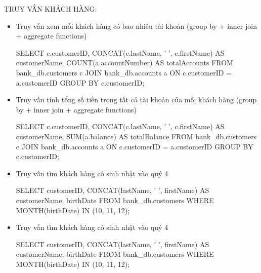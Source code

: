 
TRUY VẤN KHÁCH HÀNG:
\begin{itemize}

    \item Truy vấn xem mỗi khách hàng có bao nhiêu tài khoản (group by + inner join + aggregate functions)
    \begin{MySQLCode}
    SELECT 
        c.customerID,
        CONCAT(c.lastName, ' ', c.firstName) AS customerName,
        COUNT(a.accountNumber) AS totalAccounts
    FROM 
        bank_db.customers c
    JOIN 
        bank_db.accounts a ON c.customerID = a.customerID
    GROUP BY 
        c.customerID;
    \end{MySQLCode}

    \item Truy vấn tính tổng số tiền trong tất cả tài khoản của mỗi khách hàng (group by + inner join + aggregate functions)
    \begin{MySQLCode}
    SELECT 
        c.customerID,
	   CONCAT(c.lastName, ' ', c.firstName) AS customerName,
        SUM(a.balance) AS totalBalance
    FROM 
        bank_db.customers c
    JOIN 
        bank_db.accounts a ON c.customerID = a.customerID
    GROUP BY 
	   c.customerID;
    \end{MySQLCode}

    \item Truy vấn tìm khách hàng có sinh nhật vào quý 4
    \begin{MySQLCode}
    SELECT 
        customerID,
        CONCAT(lastName, ' ', firstName) AS customerName,
        birthDate
    FROM 
        bank_db.customers
    WHERE 
        MONTH(birthDate) IN (10, 11, 12);
    \end{MySQLCode}

    \item Truy vấn tìm khách hàng có sinh nhật vào quý 4
    \begin{MySQLCode}
    SELECT 
        customerID,
        CONCAT(lastName, ' ', firstName) AS customerName,
        birthDate
    FROM 
        bank_db.customers
    WHERE 
        MONTH(birthDate) IN (10, 11, 12);
    \end{MySQLCode}


\end{itemize}
